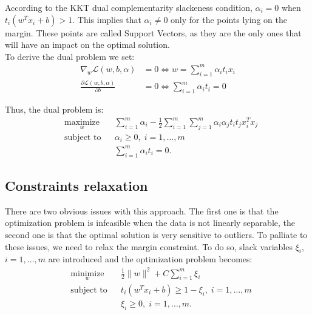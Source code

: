 According to the KKT dual complementarity slackeness condition, $\alpha_i = 0$ when $t_i(w^Tx_i+b) > 1$. This implies that  $\alpha_i \neq 0$ only for the points lying on the margin. These points are called Support Vectors, as they are the only ones that will have an impact on the optimal solution.\\
To derive the dual problem we set:
\begin{equation}
\begin{aligned}
 \nabla _w \mathcal{L}(w,b,\alpha)&=0 \Leftrightarrow w=\sum\limits_{i=1}^m \alpha_i t_i x_i\\
\frac{ \partial \mathcal{L}(w,b,\alpha)}{\partial b}&=0 \Leftrightarrow  \sum\limits_{i=1}^m \alpha_i t_i=0
\end{aligned}
\end{equation}

Thus, the dual problem is:
\begin{equation}
\begin{aligned}
& \underset{w}{\text{maximize}}
& & \sum\limits_{i=1}^m \alpha_i - \frac{1}{2} \sum\limits_{i=1}^m \sum\limits_{j=1}^m \alpha_i \alpha_j t_i t_j x_i^T x_j \\
& \text{subject to}
& & \alpha_i \geq 0, \; i = 1, \ldots, m \\
& & & \sum\limits_{i=1}^m \alpha_i t_i = 0.
\end{aligned}
\end{equation}

\subsection{Constraints relaxation}
There are two obvious issues with this approach. The first one is that the optimization problem is infeasible when the data is not linearly separable, the second one is that the optimal solution is very sensitive to outliers. To palliate to these issues, we need to relax the margin constraint. To do so, slack variables $\xi_i$, $i=1,...,m$ are introduced and the optimization problem becomes:
\begin{equation}
\begin{aligned}
& \underset{w}{\text{minimize}}
& & \frac{1}{2}\|w\|^2 + C\sum\limits_{i=1}^m \xi_i\\
& \text{subject to}
& & t_i(w^Tx_i+b) \geq 1-\xi_i, \; i = 1, \ldots, m\\
& & & \xi_i \geq 0, \; i = 1, \ldots, m.
\label{eq:svm_soft}
\end{aligned}
\end{equation}

